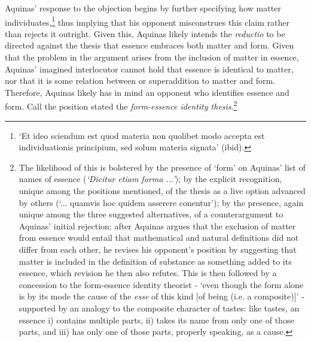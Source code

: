 \documentclass[]{article}
\begin{document}
Aquinas' response to the objection begins by further specifying how matter individuates,\footnote{`Et ideo sciendum est quod materia non quolibet modo accepta est individuationis principium, sed solum materia signata' (ibid).}  thus implying that his opponent misconstrues this claim rather than rejects it outright. Given this, Aquinas likely intends the \textit{reductio} to be directed against the thesis that essence embraces both matter and form. Given that the problem in the argument arises from the inclusion of matter in essence, Aquinas' imagined interlocutor cannot hold that essence is identical to matter, nor that it is some relation between or superaddition to matter and form. Therefore, Aquinas likely has in mind an opponent who identifies essence and form. Call the position stated the \textit{form-essence identity thesis}.\footnote{The likelihood of this is bolstered by the presence of `form' on Aquinas' list of names of essence (\textit{`Dicitur etiam forma ...'}); by the explicit recognition, unique among the positions mentioned, of the thesis as a live option advanced by others (`... quamvis hoc quidem asserere conentur'); by the presence, again unique among the three suggested alternatives, of a counterargument to Aquinas' initial rejection: after Aquinas argues that the exclusion of matter from essence would entail that mathematical and natural definitions did not differ from each other, he revises his opponent's position by suggesting that matter is included in the definition of substance as something added to its essence, which revision he then also refutes. This is then followed by a concession to the form-essence identity theorist - `even though the form alone is by its mode the cause of the \textit{esse} of this kind [of being (i.e. a composite)]' -  supported by an analogy to the composite character of tastes: like tastes, an essence i) contains multiple parts, ii) takes its name from only one of those parts, and iii) has only one of those parts, properly speaking, as a cause.}	
	
\end{document}
